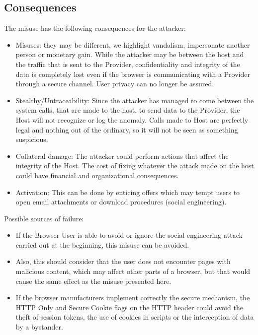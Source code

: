 \documentclass{sig-alternate-05-2015}
\begin{document}
\subsection*{Consequences}
The misuse has the following consequences for the attacker:
  \begin{itemize}
    \item Misuses: they may be different, we highlight vandalism, impersonate another person or monetary gain. While the attacker may be between the host and the traffic that is sent to the Provider, confidentiality and integrity of the data is completely lost even if the browser is communicating with a Provider through a secure channel. User privacy can no longer be assured.
    \item Stealthy/Untraceability: Since the attacker has managed to come between the system calls, that are made to the host, to send data to the Provider, the Host will not recognize or log the anomaly. Calls made to Host are perfectly legal and nothing out of the ordinary, so it will not be seen as something suspicious.
    \item Collateral damage: The attacker could perform actions that affect the integrity of the Host. The cost of fixing whatever the attack made on the host could have financial and organizational consequences.
  \item Activation: This can be done by enticing offers which may tempt users to open email attachments or download procedures (social engineering).
  \end{itemize}
  Possible sources of failure:
  \begin{itemize}
    \item If the Browser User is able to avoid or ignore the social engineering attack carried out at the beginning, this misuse can be avoided. 
    \item Also, this should consider that the user does not encounter pages with malicious content, which may affect other parts of a browser, but that would cause the same effect as the misuse presented here.
    \item If the browser manufacturers implement correctly the secure mechanism, the HTTP Only and Secure Cookie flags on the HTTP header could avoid the theft of session tokens, the use of cookies in scripts or the interception of data by a bystander.
  \end{itemize}
\end{document}
